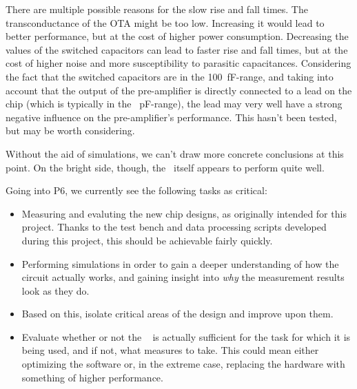 There are  multiple possible reasons  for the slow  rise and fall  times.  The
transconductance of  the OTA  might be  too low. Increasing  it would  lead to
better performance,  but at the  cost of higher  power consumption. Decreasing
the values of the switched capacitors can  lead to faster rise and fall times,
but  at  the  cost  of  higher noise  and  more  susceptibility  to  parasitic
capacitances.  Considering  the fact that  the switched capacitors are  in the
\SI{100}{\femto\farad}-range, and taking  into account that the  output of the
pre-amplifier is directly connected to a  lead on the chip (which is typically
in  the  \SI{}{\pico\farad}-range), the  lead  may  very  well have  a  strong
negative  influence  on the  pre-amplifier's  performance.   This hasn't  been
tested, but may be worth considering.

Without the  aid of simulations,  we can't  draw more concrete  conclusions at
this point.   On the bright side,  though, the \sdm~itself appears  to perform
quite well.

Going into P6, we currently see the following tasks as critical:

\begin{itemize}\tightlist
    \item
        Measuring and evaluting  the new chip designs,  as originally intended
        for this project. Thanks to the test bench and data processing scripts
        developed  during  this  project,  this should  be  achievable  fairly
        quickly.
    \item
        Performing simulations in order to  gain a deeper understanding of how
        the circuit  actually works, and  gaining insight into  \emph{why} the
        measurement results look as they do.
    \item
        Based on  this, isolate critical areas of the design and  improve upon
        them.
    \item
        Evaluate whether  or not  the \raspi~ is  actually sufficient  for the
        task for which  it is being used,  and if not, what  measures to take.
        This  could mean  either optimizing  the software  or, in  the extreme
        case, replacing the hardware with something of higher performance.
\end{itemize}
